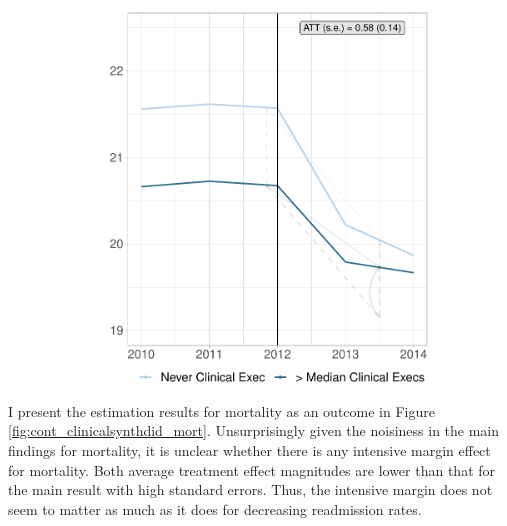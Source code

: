 \documentclass[12pt]{article}
\begin{document}
\begin{figure}[ht!]
\begin{subfigure}[b]{0.45\textwidth}
         \includegraphics[width=\textwidth]{Objects/cont_abovemedread_md_nomd_synth_graph.pdf}
         \label{fig:abovemed_read_synth_clinical}
     \end{subfigure}
        \label{fig:cont_clinicalsynthdid}
    \end{figure}

    I present the estimation results for mortality as an outcome in Figure \ref{fig:cont_clinicalsynthdid_mort}. Unsurprisingly given the noisiness in the main findings for mortality, it is unclear whether there is any intensive margin effect for mortality. Both average treatment effect magnitudes are lower than that for the main result with high standard errors. Thus, the intensive margin does not seem to matter as much as it does for decreasing readmission rates. 
\end{document}
